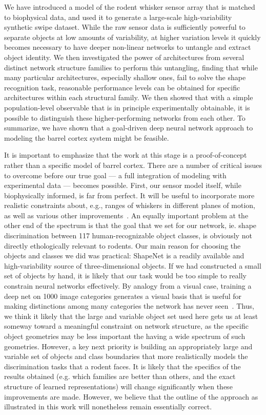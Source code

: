 We have introduced a model of the rodent whisker sensor array that is matched to biophysical data, and used it to generate a large-scale high-variability synthetic swipe dataset. 
While the raw sensor data is sufficiently powerful to separate objects at low amounts of variability, at higher variation levels it quickly becomes necessary to have deeper non-linear networks to untangle and extract object identity. 
We then investigated the power of architectures from several distinct network structure families to perform this untangling, finding that while many particular architectures, especially shallow ones, fail to solve the shape recognition task, reasonable performance levels can be obtained for specific architectures within each structural family.
We then showed that with a simple population-level observable that is in principle experimentally obtainable, it is possible to distinguish these higher-performing networks from each other. 
To summarize, we have shown that a goal-driven deep neural network approach to modeling the barrel cortex system might be feasible. 

It is important to emphasize that the work at this stage is a proof-of-concept rather than a specific model of barrel cortex.  
There are a number of critical issues to overcome before our true goal --- a full integration of modeling with experimental data --- becomes possible.    
First, our sensor model itself, while biophysically informed, is far from perfect. 
It will be useful to incorporate more realistic constraints about, e.g., ranges of whiskers in different planes of motion, as well as various other improvements~\cite{}.
An equally important problem at the other end of the spectrum is that the goal that we set for our network, ie. shape discrimination between 117 human-recognizable object classes, is obviously not directly ethologically relevant to rodents. 
Our main reason for choosing the objects and classes we did was practical: ShapeNet is a readily available and high-variability source of three-dimensional objects. 
If we had constructed a small set of objects by hand, it is likely that our task would be too simple to really constrain neural networks effectively. 
By analogy from a visual case, training a deep net on 1000 image categories generates a visual basis that is useful for making distinctions among many categories the network has never seen~\cite{}.  
Thus, we think it likely that the large and variable object set used here gets us at least someway toward a meaningful constraint on network structure, as the specific object geometries may be less important the having a wide spectrum of such geometries. 
However, a key next priority is building an appropriately large and variable set of objects and class boundaries that more realistically models the discrimination tasks that a rodent faces.
It is likely that the specifics of the results obtained (e.g. which families are better than others, and the exact structure of learned representations) will change significantly when these improvements are made.  
However, we believe that the outline of the approach as illustrated in this work will nonetheless remain essentially correct. 

